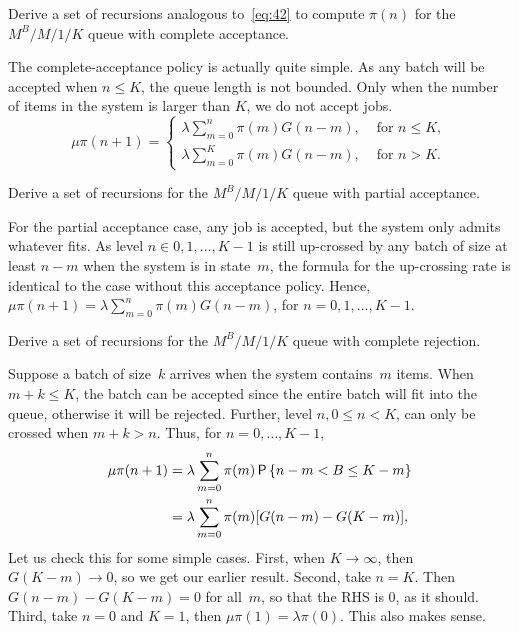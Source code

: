 \documentclass[queueing-book.tex]{subfiles}
\begin{document}
\begin{exercise}\label{ex:9}
 Derive a set of recursions analogous to~\cref{eq:42} to compute $\pi(n)$ for the $M^B/M/1/K$ queue with complete acceptance.
\begin{solution}
 The complete-acceptance policy is actually quite simple. As any
 batch will be accepted when $n\leq K$, the queue length is not
 bounded. Only when the number of items in the system is larger than
 $K$, we do not accept jobs.
 \begin{equation*}
 \mu \pi(n+1) =
 \begin{cases}
 \lambda \sum_{m=0}^n \pi(m) G(n-m), & \text{ for } n\leq K,\\
 \lambda \sum_{m=0}^K \pi(m) G(n-m), & \text{ for } n> K.
 \end{cases}
 \end{equation*}
\end{solution}
\end{exercise}



\begin{exercise}\label{ex:45}
 Derive a set of recursions for the $M^B/M/1/K$ queue with partial acceptance.
\begin{solution}
  For the partial acceptance case, any job is accepted, but the system only admits whatever fits.
  As level $n\in {0,1,\ldots,K-1}$ is still up-crossed by any batch of size at least $n-m$ when the system is in state~$m$, the formula for the up-crossing rate is identical to the case without this acceptance policy.
  Hence, $\mu \pi(n+1) = \lambda \sum_{m=0}^n \pi(m) G(n-m)$, for $n=0,1,\ldots, K-1$.
\end{solution}
\end{exercise}


\begin{exercise}\label{ex:l-156}
 Derive a set of recursions for the $M^B/M/1/K$ queue with complete rejection.
\begin{solution}
  Suppose a batch of size~$k$ arrives when the system contains~$m$ items.
  When $m+k \leq K$, the batch can be accepted since the entire batch will fit into the queue, otherwise it will be rejected.
  Further, level $n, 0\leq n < K$, can only be crossed when $m+k > n$.
  Thus, for $n=0,\ldots, K-1$,
 \begin{align*}
 \mu \pi(n+1) &= \lambda \sum_{m=0}^n \pi(m) \P{n-m < B \leq K-m} \\
&=\lambda \sum_{m=0}^n \pi(m) [G(n-m)-G(K-m)],
 \end{align*}
 Let us check this for some simple cases.
 First, when $K\to \infty$, then $G(K-m)\to 0$, so we get our earlier result.
 Second, take $n=K$.
 Then $G(n-m)-G(K-m)=0$ for all~$m$, so that the RHS is 0, as it should.
 Third, take $n=0$ and $K=1$, then $\mu \pi(1)= \lambda \pi(0)$.
 This also makes sense.
\end{solution}
\end{exercise}
\end{document}
